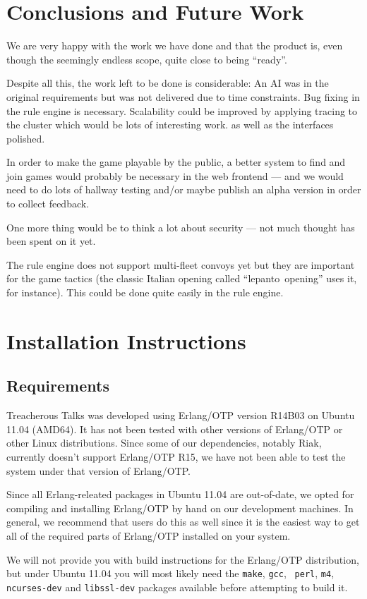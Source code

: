 \documentclass[11pt,a4paper]{report}
\begin{document}
\chapter{Conclusions and Future Work}
We are very happy with the work we have done and that the product is, even though
the seemingly endless scope, quite close to being ``ready''.

Despite all this, the work left to be done is considerable:
An AI was in the original requirements but was not delivered due to time constraints.
Bug fixing in the rule engine is necessary. Scalability could be improved by applying
tracing to the cluster which would be lots of interesting work. as well as the
interfaces polished.

In order to make the game playable by the public, a better system to find and join 
games would probably be necessary in the web frontend --- and we would need to
do lots of hallway testing and/or maybe publish an alpha version in order to collect
feedback.

One more thing would be to think a lot about security --- not much thought has been
spent on it yet.

The rule engine does not support multi-fleet convoys yet but they are important for
the game tactics (the classic Italian opening called ``lepanto~opening'' uses it, for
instance). This could be done quite easily in the rule engine.

\appendix
\chapter{Installation Instructions}
\section{Requirements}
Treacherous Talks was developed using Erlang/OTP version R14B03 on Ubuntu 11.04
(AMD64). It has not been tested with other versions of Erlang/OTP or other Linux
distributions. Since some of our dependencies, notably Riak, currently doesn't
support Erlang/OTP R15, we have not been able to test the system under that
version of Erlang/OTP.

Since all Erlang-releated packages in Ubuntu 11.04 are out-of-date, we opted for
compiling and installing Erlang/OTP by hand on our development machines. In
general, we recommend that users do this as well since it is the easiest way to
get all of the required parts of Erlang/OTP installed on your system.

We will not provide you with build instructions for the Erlang/OTP distribution,
but under Ubuntu 11.04 you will most likely need the {\tt make}, {\tt gcc}, {\tt
  perl}, {\tt m4}, {\tt ncurses-dev} and {\tt libssl-dev} packages available
before attempting to build it.
\end{document}
